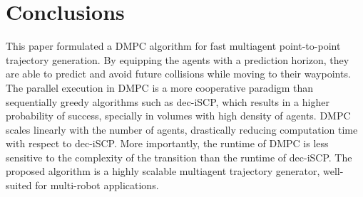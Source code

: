 \section{Conclusions}
\label{sec:conclusions}

This paper formulated a DMPC algorithm for fast multiagent point-to-point trajectory generation. By equipping the agents with a prediction horizon, they are able to predict and avoid future collisions while moving to their waypoints.  The parallel execution in DMPC is a more cooperative paradigm than sequentially greedy algorithms such as dec-iSCP, which results in a higher probability of success, specially in volumes with high density of agents. DMPC scales linearly with the number of agents, drastically reducing computation time with respect to dec-iSCP. More importantly, the runtime of DMPC is less sensitive to the complexity of the transition than the runtime of dec-iSCP. The proposed algorithm is a highly scalable multiagent trajectory generator, well-suited for multi-robot applications.
